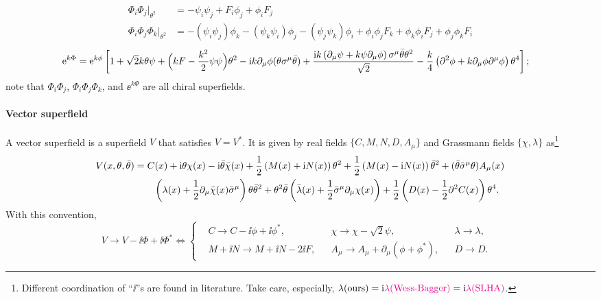 \documentclass[CheatSheet]{subfiles}
\begin{document}
\begin{align}
 \Phi_i\Phi_j\Big|_{\theta^2}&=-\psi_i\psi_j+F_i\phi_j+\phi_iF_j
\\
\Phi_i\Phi_j\Phi_k\Big|_{\theta^2}&=
-(\psi_i\psi_j)\phi_k-(\psi_k\psi_i)\phi_j-(\psi_j\psi_k)\phi_i+\phi_i\phi_jF_k+\phi_k\phi_iF_j+\phi_j\phi_kF_i
\end{align}
\begin{equation}
 \begin{split}
\mathop{}\!\mathrm{e}^{k\Phi} &=
\mathop{}\!\mathrm{e}^{k\phi}\left[1+\sqrt{2} k \theta \psi+\Bigl(kF-\frac{k^2}{2}\psi\psi\Bigr) \theta^2-\mathrm{i} k \partial_{\mu}\phi (\theta \sigma^{\mu}\bar\theta)
+\frac{\mathrm{i} k \left(\partial_{\mu}\psi+k\psi\partial_{\mu}\phi\right)\sigma^{\mu}\bar\theta \theta^2}{\sqrt{2}}-\frac{k}{4} \left(\partial^2\phi+k \partial_{\mu}\phi\partial^{\mu}\phi\right) \theta^4\right];
\end{split}
\end{equation}
note that $\Phi_i\Phi_j$, $\Phi_i\Phi_j\Phi_k$, and $\ee^{k\Phi}$ are all chiral superfields.

\paragraph{Vector superfield}
A vector superfield is a superfield $V$ that satisfies $V=V^*$.
It is given by real fields $\{C, M, N, D, A_\mu\}$ and Grassmann fields $\{\chi, \lambda\}$ as\footnote{Different coordination of ``$\ii$''s are found in literature. Take care, especially, $\lambda(\text{ours})=\mathrm{i}{{\color{magenta}\lambda(\text{Wess-Bagger})}}=\mathrm{i}{{\color{magenta}\lambda(\text{SLHA})}}$.}
\begin{equation}
\begin{split}
  V(x,\theta,\bar\theta)
&=
C(x)+\mathrm{i}\theta \chi(x)-\mathrm{i}\bar\theta\bar{\chi}(x)+\frac{1}{2} \left(M(x)+\mathrm{i} N(x)\right) \theta^2
+\frac{1}{2} \left(M(x)-\mathrm{i} N(x)\right) \bar\theta^2
+(\bar\theta\bar\sigma^{\mu}\theta)A_{\mu}(x)
\\&\qquad
\left(\lambda(x)+\frac12\partial_{\mu}\bar{\chi}(x)\bar\sigma^{\mu}\right)\theta\bar\theta^2
+\theta^2\bar\theta\left(\bar{\lambda}(x)+\frac12\bar\sigma^{\mu}\partial_{\mu}\chi(x)\right)
+\frac{1}{2} \left(D(x)-\frac12\partial^2C(x)\right) \theta^4.
\end{split}
\end{equation}
With this convention,
\begin{equation}
V\to V-\ii\Phi+\ii\Phi^*\Longleftrightarrow\left\{
\begin{split}
   &C\to C-\ii\phi+\ii\phi^*,&
 &\chi\to \chi-\sqrt2\psi,&
 &\lambda\to\lambda,&
\\
 &M+\ii N\to M+\ii N - 2\ii F,&
 &A_\mu\to A_\mu+\partial_\mu(\phi+\phi^*),&
 &D\to D.
\end{split}\right.
\end{equation}
\end{document}
